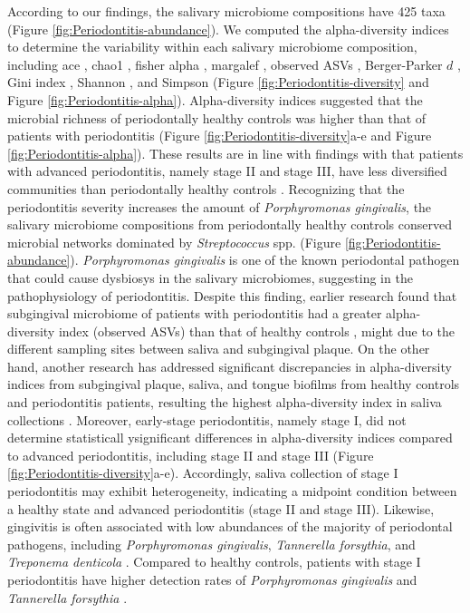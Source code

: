 \documentclass[11pt, a4paper, onecolumn, oneside]{report}
\begin{document}
            According to our findings, the salivary microbiome compositions have 425 taxa (Figure \ref{fig:Periodontitis-abundance}). We computed the alpha-diversity indices to determine the variability within each salivary microbiome composition, including ace \cite{ACE-1}, chao1 \cite{chao1-1}, fisher alpha \cite{fisher-1}, margalef \cite{margalef-1}, observed ASVs \cite{observed-ASVs-1}, Berger-Parker $d$ \cite{Berger-1}, Gini index \cite{Gini-1}, Shannon \cite{Shannon-1}, and Simpson \cite{Simpson-1} (Figure \ref{fig:Periodontitis-diversity} and Figure \ref{fig:Periodontitis-alpha}). Alpha-diversity indices suggested that the microbial richness of periodontally healthy controls was higher than that of patients with periodontitis (Figure \ref{fig:Periodontitis-diversity}a-e and Figure \ref{fig:Periodontitis-alpha}). These results are in line with findings with that patients with advanced periodontitis, namely stage II and stage III, have less diversified communities than periodontally healthy controls \cite{Periodontitis-18}. Recognizing that the periodontitis severity increases the amount of \textit{Porphyromonas gingivalis}, the salivary microbiome compositions from periodontally healthy controls conserved microbial networks dominated by \textit{Streptococcus} spp. (Figure \ref{fig:Periodontitis-abundance}). \textit{Porphyromonas gingivalis} is one of the known periodontal pathogen that could cause dysbiosys in the salivary microbiomes, suggesting in the pathophysiology of periodontitis. Despite this finding, earlier research found that subgingival microbiome of patients with periodontitis had a greater alpha-diversity index (observed ASVs) than that of healthy controls \cite{Periodontitis-10}, might due to the different sampling sites between saliva and subgingival plaque. On the other hand, another research has addressed significant discrepancies in alpha-diversity indices from subgingival plaque, saliva, and tongue biofilms from healthy controls and periodontitis patients, resulting the highest alpha-diversity index in saliva collections \cite{Periodontitis-19}. Moreover, early-stage periodontitis, namely stage I, did not determine statisticall ysignificant differences in alpha-diversity indices compared to advanced periodontitis, including stage II and stage III (Figure \ref{fig:Periodontitis-diversity}a-e). Accordingly, saliva collection of stage I periodontitis may exhibit heterogeneity, indicating a midpoint condition between a healthy state and advanced periodontitis (stage II and stage III). Likewise, gingivitis is often associated with low abundances of the majority of periodontal pathogens, including \textit{Porphyromonas gingivalis}, \textit{Tannerella forsythia}, and \textit{Treponema denticola} \cite{Periodontitis-7}. Compared to healthy controls, patients with stage I periodontitis have higher detection rates of \textit{Porphyromonas gingivalis} and \textit{Tannerella forsythia} \cite{Periodontitis-20, Periodontitis-21}.
\end{document}
